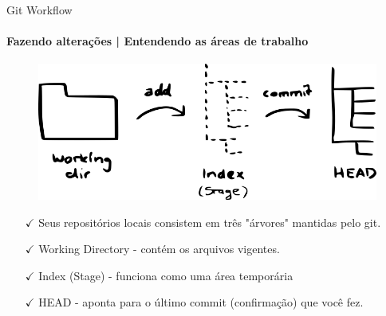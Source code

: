 \documentclass[xcolor=dvipsnames,t]{beamer}
\begin{document}
\begin{frame}[fragile]{Git Workflow}
\framesubtitle{Fazendo alterações | Entendendo as áreas de trabalho}

	\begin{figure}
		\centering			
		\includegraphics[width=0.6\linewidth]{figures/treesv2}
	\end{figure}	
	
	\begin{itemize}		
		\small
		\item[$\checkmark$] Seus repositórios locais consistem em três "árvores" mantidas pelo git. 
		\item[$\checkmark$] Working Directory - contém os arquivos vigentes.
		\item[$\checkmark$] Index (Stage) - funciona como uma área temporária
		\item[$\checkmark$] HEAD - aponta para o último commit (confirmação) que você fez. 
	\end{itemize}

\end{frame}
\end{document}
